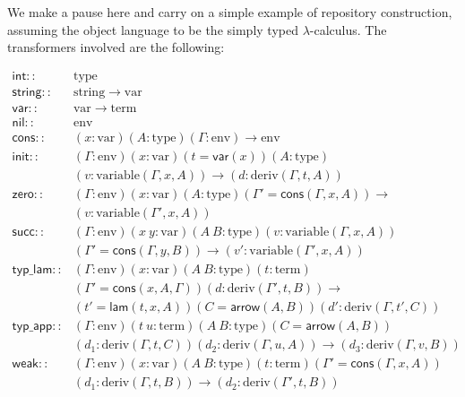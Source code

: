 \documentclass[twoside,a4paper,12pt]{article}
\newcommand{\To}{\longrightarrow}
\begin{document}
We make a pause here and carry on a simple example of repository
construction, assuming the object language to be the simply typed
$\lambda$-calculus. The transformers involved are the following:

\begin{align*}
  \mathsf{int}::{}&\mathrm{type} \\
  \mathsf{string}::{}&\mathrm{string}\To\mathrm{var}\\
  \mathsf{var}::{}&\mathrm{var} \longrightarrow \mathrm{term} \\
  \mathsf{nil}::{}&\mathrm{env} \\
  \mathsf{cons}::{}&(x:\mathrm{var})(A:\mathrm{type})(\Gamma:\mathrm{env})
  \To
  \mathrm{env} \\
  \mathsf{init}::{}&(\Gamma:\mathrm{env}) (x:\mathrm{var})
  (t=\mathsf{var}(x)) (A:\mathrm{type}) \\ {}&
  (v:\mathrm{variable}(\Gamma,x,A)) \To
  (d:\mathrm{deriv}(\Gamma,t,A))
  \\
  \mathsf{zero}::{}& (\Gamma:\mathrm{env})(x:\mathrm{var})
  (A:\mathrm{type})(\Gamma'=\mathsf{cons}(\Gamma,x,A)) \To \\ {}&
  (v:\mathrm{variable}(\Gamma',x,A)) \\
  \mathsf{succ}::{}& (\Gamma:\mathrm{env}) (x\ y:\mathrm{var}) (A\
  B:\mathrm{type}) (v:\mathrm{variable}(\Gamma,x,A)) \\ {}&
  (\Gamma'=\mathsf{cons}(\Gamma,y,B)) \To
  (v':\mathrm{variable}(\Gamma',x,A)) \\
  \mathsf{typ\_lam}::{}& (\Gamma:\mathrm{env})(x:\mathrm{var})(A\
  B:\mathrm{type}) (t:\mathrm{term}) \\ {}&
  (\Gamma'=\mathsf{cons}(x,A,\Gamma))(d:\mathrm{deriv}(\Gamma',t,B))\To
  \\ {}&
  (t'=\mathsf{lam}(t,x,A))(C=\mathsf{arrow}(A,B))(d':\mathrm{deriv}
  (\Gamma,t',C)) \\
  \mathsf{typ\_app}::{}&(\Gamma:\mathrm{env})(t\ u:\mathrm{term})(A\
  B:\mathrm{type}) (C=\mathsf{arrow}(A,B)) \\ {}&
  (d_1:\mathrm{deriv}(\Gamma,t,C))(d_2:\mathrm{deriv}(\Gamma,u,A))
  \To (d_3:\mathrm{deriv}(\Gamma,v,B)) \\
  \mathsf{weak}::{}&(\Gamma:\mathrm{env})(x:\mathrm{var})(A\
  B:\mathrm{type})(t:\mathrm{term})(\Gamma'=\mathsf{cons}(\Gamma,x,A))
  \\{}& (d_1:\mathrm{deriv}(\Gamma,t,B)) \To
  (d_2:\mathrm{deriv}(\Gamma',t,B))
\end{align*}
\end{document}

